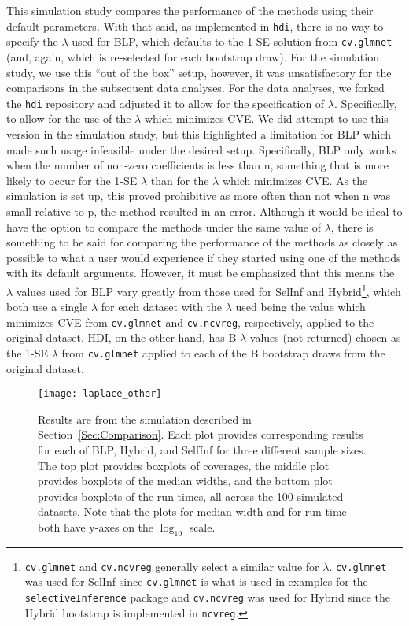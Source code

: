 This simulation study compares the performance of the methods using their default parameters. With that said, as implemented in \texttt{hdi}, there is no way to specify the $\lambda$ used for BLP, which defaults to the 1-SE solution from \texttt{cv.glmnet} (and, again, which is re-selected for each bootstrap draw). For the simulation study, we use this ``out of the box'' setup, however, it was unsatisfactory for the comparisons in the subsequent data analyses. For the data analyses, we forked the \texttt{hdi} repository and adjusted it to allow for the specification of $\lambda$. Specifically, to allow for the use of the $\lambda$ which minimizes CVE. We did attempt to use this version in the simulation study, but this highlighted a limitation for BLP which made such usage infeasible under the desired setup. Specifically, BLP only works when the number of non-zero coefficients is less than n, something that is more likely to occur for the 1-SE $\lambda$ than for the $\lambda$ which minimizes CVE. As the simulation is set up, this proved prohibitive as more often than not when n was small relative to p, the method resulted in an error. Although it would be ideal to have the option to compare the methods under the same value of $\lambda$, there is something to be said for comparing the performance of the methods as closely as possible to what a user would experience if they started using one of the methods with its default arguments. However, it must be emphasized that this means the $\lambda$ values used for BLP vary greatly from those used for SelInf and Hybrid\footnote{\texttt{cv.glmnet} and \texttt{cv.ncvreg} generally select a similar value for $\lambda$. \texttt{cv.glmnet} was used for SelInf since \texttt{cv.glmnet} is what is used in examples for the \texttt{selectiveInference} package and \texttt{cv.ncvreg} was used for Hybrid since the Hybrid bootstrap is implemented in \texttt{ncvreg}.}, which both use a single $\lambda$ for each dataset with the $\lambda$ used being the value which minimizes CVE from \texttt{cv.glmnet} and \texttt{cv.ncvreg}, respectively, applied to the original dataset. HDI, on the other hand, has B $\lambda$ values (not returned) chosen as the 1-SE $\lambda$ from \texttt{cv.glmnet} applied to each of the B bootstrap draws from the original dataset.

\begin{figure}[hbtp]
  \begin{center}
  \texttt{[image: laplace\_other]}
  \caption{\label{Fig:laplace_other} Results are from the simulation described in Section~\ref{Sec:Comparison}. Each plot provides corresponding results for each of BLP, Hybrid, and SelfInf for three different sample sizes. The top plot provides boxplots of coverages, the middle plot provides boxplots of the median widths, and the bottom plot provides boxplots of the run times, all across the 100 simulated datasets. Note that the plots for median width and for run time both have y-axes on the $\log_10$ scale.}
  \end{center}
\end{figure}

